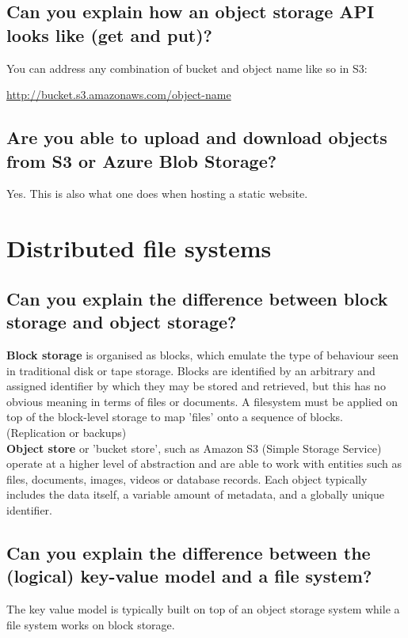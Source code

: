 \documentclass{article}
\begin{document}
\subsection{Can you explain how an object storage API looks like (get and put)?}

You can address any combination of bucket and object name like so in S3:

\url{http://bucket.s3.amazonaws.com/object-name}

\subsection{Are you able to upload and download objects from S3 or Azure Blob Storage?}

Yes. This is also what one does when hosting a static website.



\section{Distributed file systems}
\subsection{Can you explain the difference between block storage and object storage?}

\textbf{Block storage} is organised as blocks, which emulate the type of behaviour seen in traditional disk or tape storage. Blocks are identified by an arbitrary and assigned identifier by which they may be stored and retrieved, but this has no obvious meaning in terms of files or documents. A filesystem must be applied on top of the block-level storage to map 'files' onto a sequence of blocks. (Replication or backups)\\
\textbf{Object store} or 'bucket store', such as Amazon S3 (Simple Storage Service) operate at a higher level of abstraction and are able to work with entities such as files, documents, images, videos or database records. Each object typically includes the data itself, a variable amount of metadata, and a globally unique identifier.

\subsection{Can you explain the difference between the (logical) key-value model and a file system?}

The key value model is typically built on top of an object storage system while a file system works on block storage.
\end{document}

